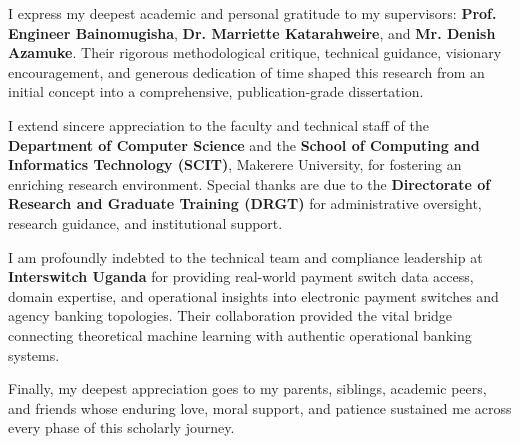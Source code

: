 \documentclass[a4paper,12pt]{report}
\begin{document}
I express my deepest academic and personal gratitude to my supervisors: \textbf{Prof. Engineer Bainomugisha}, \textbf{Dr. Marriette Katarahweire}, and \textbf{Mr. Denish Azamuke}. Their rigorous methodological critique, technical guidance, visionary encouragement, and generous dedication of time shaped this research from an initial concept into a comprehensive, publication-grade dissertation.

I extend sincere appreciation to the faculty and technical staff of the \textbf{Department of Computer Science} and the \textbf{School of Computing and Informatics Technology (SCIT)}, Makerere University, for fostering an enriching research environment. Special thanks are due to the \textbf{Directorate of Research and Graduate Training (DRGT)} for administrative oversight, research guidance, and institutional support.

I am profoundly indebted to the technical team and compliance leadership at \textbf{Interswitch Uganda} for providing real-world payment switch data access, domain expertise, and operational insights into electronic payment switches and agency banking topologies. Their collaboration provided the vital bridge connecting theoretical machine learning with authentic operational banking systems.

Finally, my deepest appreciation goes to my parents, siblings, academic peers, and friends whose enduring love, moral support, and patience sustained me across every phase of this scholarly journey.

\newpage
\tableofcontents

\newpage
\listoftables
{}

\newpage
\listoffigures
{}

\newpage

\end{document}
